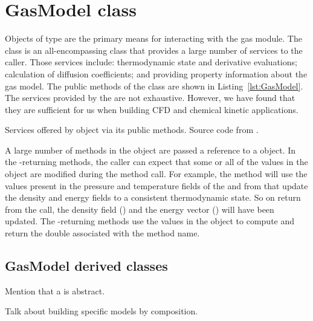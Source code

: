 \section{GasModel class}
Objects of type  are the primary means for interacting
with the gas module.
The  class is an all-encompassing class that provides
a large number of services to the caller.
Those services include: thermodynamic state and derivative evaluations;
calculation of diffusion coefficients; and providing property information
about the gas model.
The public methods of the  class are shown in Listing~\ref{lst:GasModel}.
The services provided by the  are not exhaustive.
However, we have found that they are sufficient for us when building
CFD and chemical kinetic applications.

\begin{Listing}

\caption{Services offered by  object via its public methods. Source code from .}
\label{lst:GasModel}
\end{Listing}

A large number of methods in the  object are passed a reference
to a  object.
In the -returning methods, the caller can expect that some
or all of the values in the  object are modified during
the method call.
For example, the method  will use the 
values present in the pressure and temperature fields of the
 and from that update the density and energy fields
to a consistent thermodynamic state.
So on return from the call, the density field () and
the energy vector () will have been updated.
The -returning methods use the values in
the  object to compute and return the double
associated with the method name.

\subsection{GasModel derived classes}

Mention that a  is abstract.

Talk about building specific models by composition.






